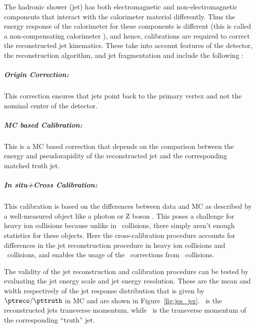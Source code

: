 
The hadronic shower (jet) has both electromagnetic and non-electromagnetic components that interact with the calorimeter material differently.
Thus the energy response of the calorimeter for these components is different (this is called a non-compensating calorimeter \cite{calorimetry_book}), and hence, calibrations are required to correct the reconstructed jet kinematics.
These take into account features of the detector, the reconstruction algorithm, and jet fragmentation and include the following \cite{Aad:2014bia}:
\subparagraph{Origin Correction: } This correction ensures that jets point back to the primary vertex and not the nominal center of the detector.
\subparagraph{MC based Calibration: } This is a MC based correction that depends on the comparison between the energy and pseudorapidity of the reconstructed jet and the corresponding matched truth jet.
\subparagraph{\textit{In situ}+Cross Calibration: } This calibration is based on the differences between data and MC as described by a well-measured object like a photon or Z boson \cite{cc2015, HIjesnote}.
This poses a challenge for heavy ion collisions because unlike in \pp\ collisions, there simply aren't enough statistics for these objects.
Here the cross-calibration procedure accounts for differences in the jet reconstruction procedure in heavy ion collisions and \pp\ collisions, and enables the usage of the \insitu\ corrections from \pp\ collisions.

The validity of the jet reconstruction and calibration procedure can be tested by evaluating the jet energy scale and jet energy resolution.
These are the mean and width respectively of the jet response distribution that is given by $\ptreco / \pttruth$ in MC and are shown in Figure~\ref{fig:jes_jer}.
\ptreco\ is the reconstructed jets transverse momentum, while \pttruth\ is the transverse momentum of the corresponding ``truth'' jet.


